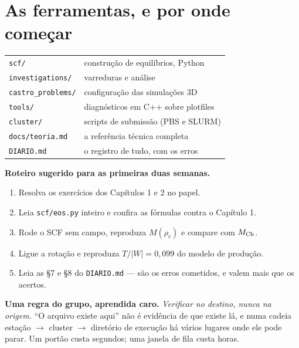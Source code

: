 \documentclass[11pt,a4paper]{article}
\newcommand{\Mch}{M_{\rm Ch}}
\newcommand{\code}[1]{\texttt{\small #1}}
\newcounter{exerc}[section]
\begin{document}
\section{As ferramentas, e por onde começar}

\begin{center}
\begin{tabular}{ll}
\hline
\code{scf/} & construção de equilíbrios, Python \\
\code{investigations/} & varreduras e análise \\
\code{castro\_problems/} & configuração das simulações 3D \\
\code{tools/} & diagnósticos em C++ sobre plotfiles \\
\code{cluster/} & scripts de submissão (PBS e SLURM) \\
\code{docs/teoria.md} & a referência técnica completa \\
\code{DIARIO.md} & o registro de tudo, com os erros \\
\hline
\end{tabular}
\end{center}

\begin{caixa}
\textbf{Roteiro sugerido para as primeiras duas semanas.}
\begin{enumerate}
\item Resolva os exercícios dos Capítulos 1 e 2 no papel.
\item Leia \code{scf/eos.py} inteiro e confira as fórmulas contra o
      Capítulo 1.
\item Rode o SCF sem campo, reproduza $M(\rho_c)$ e compare com $\Mch$.
\item Ligue a rotação e reproduza $T/|W| = 0{,}099$ do modelo de produção.
\item Leia as §7 e §8 do \code{DIARIO.md} --- são os erros cometidos, e
      valem mais que os acertos.
\end{enumerate}
\end{caixa}

\begin{alerta}
\textbf{Uma regra do grupo, aprendida caro.} \emph{Verificar no destino, nunca
na origem.} ``O arquivo existe aqui'' não é evidência de que existe lá, e numa
cadeia estação $\to$ cluster $\to$ diretório de execução há vários lugares onde
ele pode parar. Um portão custa segundos; uma janela de fila custa horas.
\end{alerta}

\end{document}
